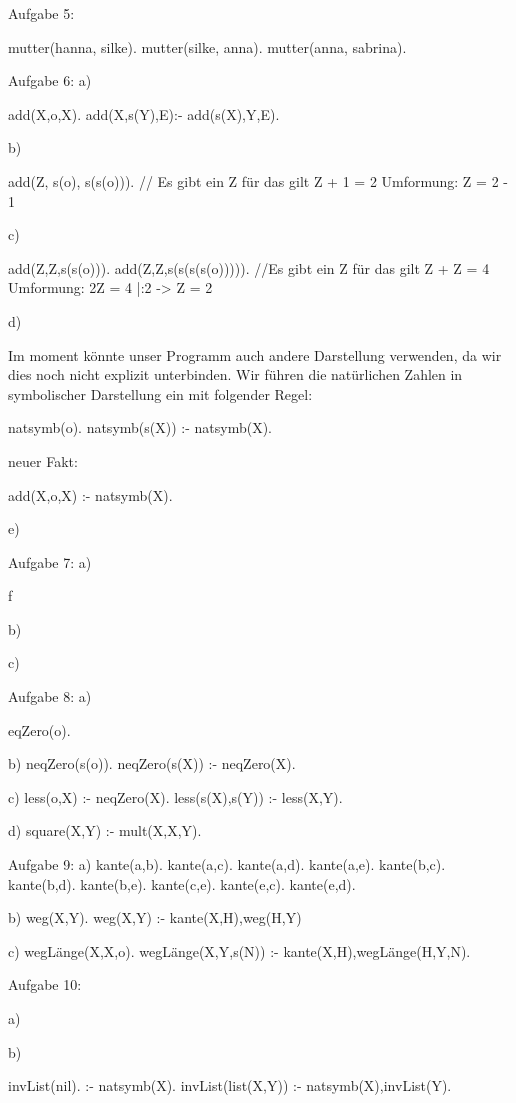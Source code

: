 Aufgabe 5:

mutter(hanna, silke).
mutter(silke, anna).
mutter(anna, sabrina).


Aufgabe 6:
a)

add(X,o,X).
add(X,s(Y),E):- add(s(X),Y,E).

b)

add(Z, s(o), s(s(o))). // Es gibt ein Z für das gilt Z + 1 = 2 Umformung: Z = 2 - 1

c)

add(Z,Z,s(s(o))).
add(Z,Z,s(s(s(s(o))))). //Es gibt ein Z für das gilt Z + Z = 4 Umformung: 2Z = 4 |:2 -> Z = 2

d)

Im moment könnte unser Programm auch andere Darstellung verwenden, da wir dies noch nicht explizit unterbinden.
Wir führen die natürlichen Zahlen in symbolischer Darstellung ein mit folgender Regel:

natsymb(o).
natsymb(s(X)) :- natsymb(X).

neuer Fakt:

add(X,o,X) :- natsymb(X).

e)


Aufgabe 7:
a)

f

b)

c)



Aufgabe 8:
a)

eqZero(o).

b)
neqZero(s(o)).
neqZero(s(X)) :-  neqZero(X).

c)
less(o,X) :- neqZero(X).
less(s(X),s(Y)) :- less(X,Y).

d)
square(X,Y) :- mult(X,X,Y).


Aufgabe 9:
a)
kante(a,b).
kante(a,c).
kante(a,d).
kante(a,e).
kante(b,c).
kante(b,d).
kante(b,e).
kante(c,e).
kante(e,c).
kante(e,d).
 
b)
weg(X,Y).
weg(X,Y) :- kante(X,H),weg(H,Y)

c)
wegLänge(X,X,o).
wegLänge(X,Y,s(N)) :- kante(X,H),wegLänge(H,Y,N).

Aufgabe 10:

a)


b)

invList(nil). :- natsymb(X).
invList(list(X,Y)) :- natsymb(X),invList(Y).